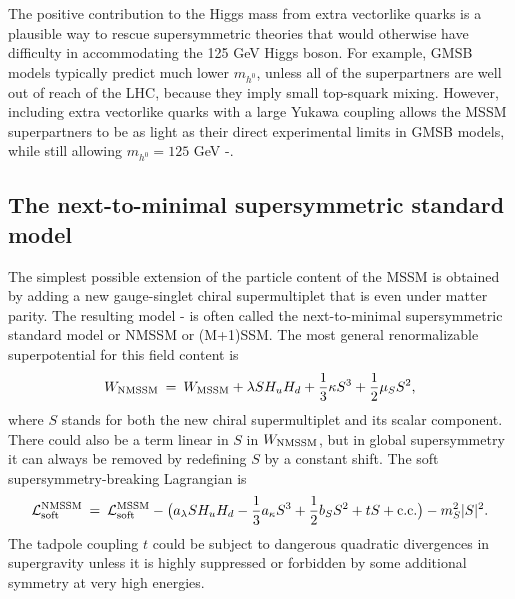 \documentclass[11pt]{article}
\def\beq{\begin{eqnarray}}
\def\eeq{\end{eqnarray}}
\def\conj{{{\rm c.c.}}}
\begin{document}
The positive contribution to the Higgs mass from extra vectorlike quarks 
is a plausible way to rescue supersymmetric theories that 
would otherwise have difficulty in accommodating the 125 GeV Higgs boson. For example,
GMSB models typically predict much lower $m_{h^0}$, unless all of the superpartners are 
well out of reach of the LHC, because they imply small top-squark mixing. 
However, including extra vectorlike quarks with a large Yukawa coupling
allows the MSSM superpartners to be as light as their direct experimental 
limits in GMSB models, while still allowing
$m_{h^0} = 125$ GeV 
\cite{Endo:2011mc}-\cite{Martin:2012dg}.

\subsection{The next-to-minimal supersymmetric standard
model}\label{subsec:variations.NMSSM}
\setcounter{equation}{0}

The simplest possible extension of the particle content of the MSSM is 
obtained by adding a new gauge-singlet chiral supermultiplet that is 
even under matter parity. The resulting model 
\cite{NMSSM}-\cite{nMSSM} 
is often 
called the next-to-minimal supersymmetric standard model or NMSSM or 
(M+1)SSM. The most general renormalizable superpotential for this field 
content is
\beq
W_{\rm NMSSM} \>=\> W_{\rm MSSM}
+ \lambda S H_u H_d + \frac{1}{3} \kappa S^3 + \frac{1}{2} \mu_S S^2  ,
\label{NMSSMwww}
\eeq
where $S$ stands for both the new chiral supermultiplet and its scalar 
component. There could also be a term linear in $S$ in $W_{\rm NMSSM}$, 
but in global supersymmetry it can always be removed by redefining $S$ by 
a constant shift. The soft supersymmetry-breaking Lagrangian is
\beq
{\cal L}_{\rm soft}^{\rm NMSSM} \>=\> {\cal L}_{\rm soft}^{\rm MSSM}
-\bigl (
a_{\lambda} S H_u H_d - {1\over 3} a_\kappa S^3 + {1\over 2} b_S S^2
+ t S
+ \conj \bigr ) -m_S^2 |S|^2
.
\label{eq:NMSSMsoft}
\eeq
The tadpole coupling $t$ could be subject to dangerous quadratic 
divergences in supergravity \cite{NMSSMtadpole} unless it is highly 
suppressed or forbidden by some additional symmetry at very high energies.
\end{document}
